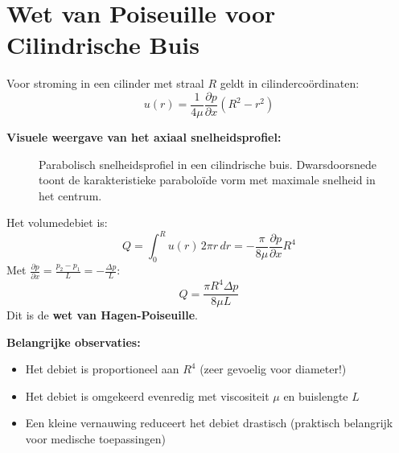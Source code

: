 \documentclass[a4paper,11pt,twoside]{report}
\begin{document}
\section{Wet van Poiseuille voor Cilindrische Buis}
Voor stroming in een cilinder met straal $R$ geldt in cilindercoördinaten:
\[
u(r) = \frac{1}{4\mu} \frac{\partial p}{\partial x} (R^2 - r^2)
\]

\textbf{Visuele weergave van het axiaal snelheidsprofiel:}

\begin{figure}[H]
    \centering
    \caption{Parabolisch snelheidsprofiel in een cilindrische buis. Dwarsdoorsnede toont de karakteristieke paraboloïde vorm met maximale snelheid in het centrum.}
\end{figure}

Het volumedebiet is:
\[
Q = \int_0^R u(r) \, 2\pi r \, dr = -\frac{\pi}{8\mu} \frac{\partial p}{\partial x} R^4
\]
Met $\frac{\partial p}{\partial x} = \frac{p_2 - p_1}{L} = -\frac{\Delta p}{L}$:
\[
Q = \frac{\pi R^4 \Delta p}{8\mu L}
\]
Dit is de \textbf{wet van Hagen-Poiseuille}.

\textbf{Belangrijke observaties:}
\begin{itemize}
    \item Het debiet is proportioneel aan $R^4$ (zeer gevoelig voor diameter!)
    \item Het debiet is omgekeerd evenredig met viscositeit $\mu$ en buislengte $L$
    \item Een kleine vernauwing reduceert het debiet drastisch (praktisch belangrijk voor medische toepassingen)
\end{itemize}
\end{document}
